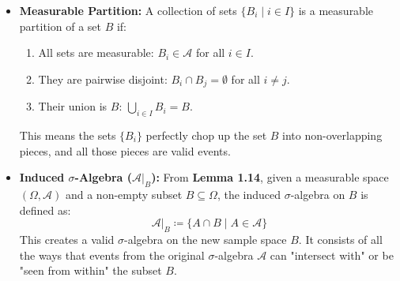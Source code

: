 \documentclass[11pt,a4paper]{article}
\newcommand{\explanation}[2]{\item[\hypertarget{note#1}{\textcolor{blue}{[#1]}}] \textbf{#2}}
\begin{document}
\begin{itemize}
    \explanation{4}{Measurable Partition:} A collection of sets \(\{B_i \mid i \in I\}\) is a measurable partition of a set \(B\) if:
    \begin{enumerate}
        \item All sets are measurable: \(B_i \in \mathcal{A}\) for all \(i \in I\).
        \item They are pairwise disjoint: \(B_i \cap B_j = \emptyset\) for all \(i \neq j\).
        \item Their union is \(B\): \(\bigcup_{i \in I} B_i = B\).
    \end{enumerate}
    This means the sets \(\{B_i\}\) perfectly chop up the set \(B\) into non-overlapping pieces, and all those pieces are valid events.

    \explanation{5}{Induced \(\sigma\)-Algebra (\(\mathcal{A}|_B\)):} From \textbf{Lemma 1.14}, given a measurable space \((\Omega, \mathcal{A})\) and a non-empty subset \(B \subseteq \Omega\), the induced \(\sigma\)-algebra on \(B\) is defined as:
    \[ \mathcal{A}|_B \coloneqq \{A \cap B \mid A \in \mathcal{A}\} \]
    This creates a valid \(\sigma\)-algebra on the new sample space \(B\). It consists of all the ways that events from the original \(\sigma\)-algebra \(\mathcal{A}\) can "intersect with" or be "seen from within" the subset \(B\).
\end{itemize}
\end{document}
